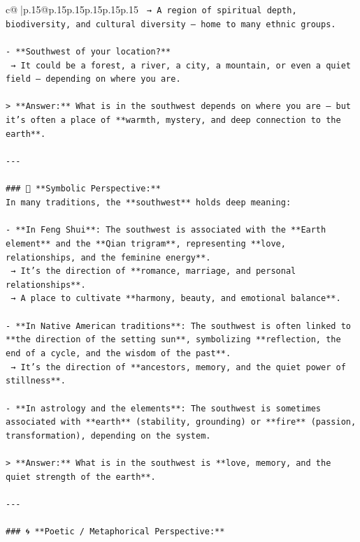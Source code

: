 \documentclass{article}
\begin{document}
{\begin{supertabular}{c@{$\;$}|p{.15\linewidth}@{}p{.15\linewidth}p{.15\linewidth}p{.15\linewidth}p{.15\linewidth}p{.15\linewidth}}
{{{\texttt{  → A region of spiritual depth, biodiversity, and cultural diversity — home to many ethnic groups.} \\
\\ 
\texttt{{-} **Southwest of your location?**  } \\
\texttt{  → It could be a forest, a river, a city, a mountain, or even a quiet field — depending on where you are.} \\
\\ 
\texttt{> **Answer:** What is in the southwest depends on where you are — but it’s often a place of **warmth, mystery, and deep connection to the earth**.} \\
\\ 
\texttt{{-}{-}{-}} \\
\\ 
\texttt{\#\#\# 🌌 **Symbolic Perspective:**} \\
\texttt{In many traditions, the **southwest** holds deep meaning:} \\
\\ 
\texttt{{-} **In Feng Shui**: The southwest is associated with the **Earth element** and the **Qian trigram**, representing **love, relationships, and the feminine energy**.  } \\
\texttt{  → It’s the direction of **romance, marriage, and personal relationships**.  } \\
\texttt{  → A place to cultivate **harmony, beauty, and emotional balance**.} \\
\\ 
\texttt{{-} **In Native American traditions**: The southwest is often linked to **the direction of the setting sun**, symbolizing **reflection, the end of a cycle, and the wisdom of the past**.  } \\
\texttt{  → It’s the direction of **ancestors, memory, and the quiet power of stillness**.} \\
\\ 
\texttt{{-} **In astrology and the elements**: The southwest is sometimes associated with **earth** (stability, grounding) or **fire** (passion, transformation), depending on the system.} \\
\\ 
\texttt{> **Answer:** What is in the southwest is **love, memory, and the quiet strength of the earth**.} \\
\\ 
\texttt{{-}{-}{-}} \\
\\ 
\texttt{\#\#\# 🌀 **Poetic / Metaphorical Perspective:**} \\
}}}
\end{supertabular}}
\end{document}
